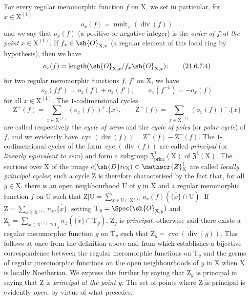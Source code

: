 \begin{env}[21.6.7]
For every regular meromorphic function $f$ on $\mathrm{X}$, we set in particular, for $x\in\mathrm{X}^{(1)}$
\[
\label{IV.21.6.7.3}
  o_x(f)=\operatorname{mult}_x(\operatorname{div}(f))
  \tag{21.6.7.3}
\]
and we say that $o_x(f)$ (a positive or negative integer) is the \emph{order of $f$ at the point} $x\in\mathrm{X}^{(1)}$.
If $f_x\in\sh{O}_{\mathrm{X},x}$ (a regular element of this local ring by hypothesis), then we have
\[
\label{IV.21.6.7.4}
  o_x(f)=\operatorname{length}(\sh{O}_{\mathrm{X},x}/f_x\sh{O}_{\mathrm{X},x});
  \tag{21.6.7.4}
\]
for two regular meromorphic functions $f$, $f'$ on $\mathrm{X}$, we have
\[
\label{IV.21.6.7.5}
  o_x(ff')=o_x(f)+o_x(f'),\qquad o_x(f^{-1})=-o_x(f)
  \tag{21.6.7.5}
\]
for all $x\in\mathrm{X}^{(1)}$.
The $1$-codimensional cycles
\[
  \mathrm{Z}^+(f)=\sum_{x\in\mathrm{X}^{(1)}}(o_x(f))^+.\overline{\{x\}},\qquad
  \mathrm{Z}^-(f)=\sum_{x\in\mathrm{X}^{(1)}}(o_x(f))^-.\overline{\{x\}}
\]
are called respectively the \emph{cycle of zeros} and the \emph{cycle of poles} (or \emph{polar cycle}) of $f$, and we evidently have $\operatorname{cyc}(\operatorname{div}(f))=\mathrm{Z}^+(f)-\mathrm{Z}^-(f)$.
The $1$-codimensional cycles of the form $\operatorname{cyc}(\operatorname{div}(f))$ are called \emph{principal} (or \emph{linearly equivalent to zero}) and form a subgroup $\mathfrak{Z}^1_\mathrm{princ}(\mathrm{X})$ of $\mathfrak{Z}^1(\mathrm{X})$.
The sections over $\mathrm{X}$ of the image $c(\sh{D}iv_\mathrm{X})\subset\mathscr{Z}_\mathrm{X}^1$ are
called \emph{locally principal cycles};
such a cycle $\mathrm{Z}$ is therefore characterised by the fact that, for all $y\in\mathrm{X}$, there is an open neighbourhood $\mathrm{U}$ of $y$ in $\mathrm{X}$ and a regular meromorphic function $f$ on $\mathrm{U}$ such that $\mathrm{Z}|\mathrm{U}=\sum_{x\in\mathrm{U}\cap\mathrm{X}^{(1)}}o_x(f)(\overline{\{x\}}\cap\mathrm{U})$.
If $\mathrm{Z}=\sum_{x\in\mathrm{X}^{(1)}}n_x.\overline{\{x\}}$, setting $\mathrm{T}_y=\Spec(\sh{O}_{\mathrm{X},y})$ and $\mathrm{Z}_y=\sum_{x\in\mathrm{X}^{(1)}\cap\mathrm{T}_y}n_x(\overline{\{x\}}\cap\mathrm{T}_y)$, $\mathrm{Z}_y$ is \emph{principal}, otherwise said there exists a regular meromorphic function $g$ on $\mathrm{T}_y$ such that $\mathrm{Z}_y=\operatorname{cyc}(\operatorname{div}(g))$.
This follows at once from the definition above and from  which establishes a bijective correspondence between the regular meromorphic functions on $\mathrm{T}_y$ and the germs of regular meromorphic functions on the open neighbourhoods of $y$ in $\mathrm{X}$ when $\mathrm{X}$ is locally Noetherian.
We express this further by saying that $\mathrm{Z}_y$ is principal in saying that $\mathrm{Z}$ is \emph{principal at the point $y$}.
The set of points where $\mathrm{Z}$ is principal is evidently \emph{open}, by virtue of what precedes.


\end{env}
